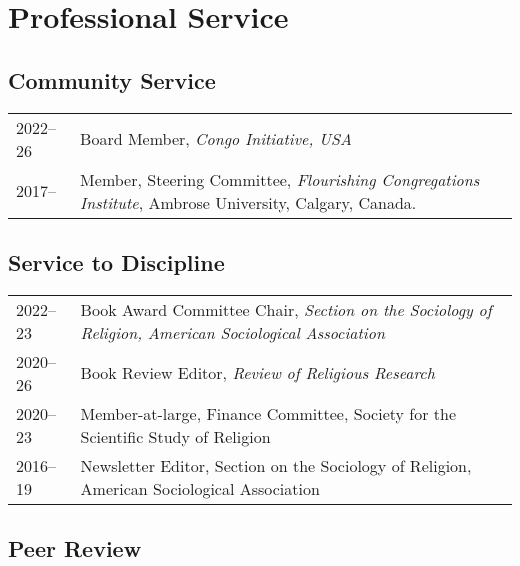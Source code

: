 \section*{Professional Service}
\newcommand{\tabitem}{~~\llap{\textbullet}~~}
\subsection*{Community Service}
\begin{tabular}{p{} p{}}
2022--26 & Board Member, \textit{Congo Initiative, USA}\\
2017-- & Member, Steering Committee, \textit{Flourishing Congregations Institute}, Ambrose University, Calgary, Canada.\\
\end{tabular}

\subsection*{Service to Discipline}

\begin{tabular}{p{} p{}}
2022--23 & Book Award Committee Chair, \textit{Section on the Sociology of Religion, American Sociological Association}\\
2020--26 & Book Review Editor, \textit{Review of Religious Research}\\
2020--23 & Member-at-large, Finance Committee, Society for the Scientific Study of Religion\\
2016--19 & Newsletter Editor, Section on the Sociology of Religion, American Sociological Association\\
\end{tabular}

\subsection*{Peer Review}

